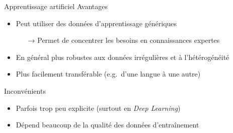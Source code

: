 \documentclass[hyperref={unicode}, xcolor={svgnames}, french]{beamer}
\begin{document}
\begin{frame}{Apprentissage artificiel}
    Avantages
    \begin{itemize}
        \item Peut utiliser des données d'apprentissage génériques
            \begin{itemize}
                \item[→] Permet de concentrer les besoins en connaissances expertes
            \end{itemize}
        \item En général plus robustes aux données irrégulières et à l'hétérogénéité
        \item Plus facilement transférable (e.g.\ d'une langue à une autre)
    \end{itemize}
    Inconvénients
    \begin{itemize}
        \item Parfois trop peu explicite (surtout en \textit{Deep Learning})
        \item Dépend beaucoup de la qualité des données d'entraînement
    \end{itemize}
\end{frame}
\end{document}
